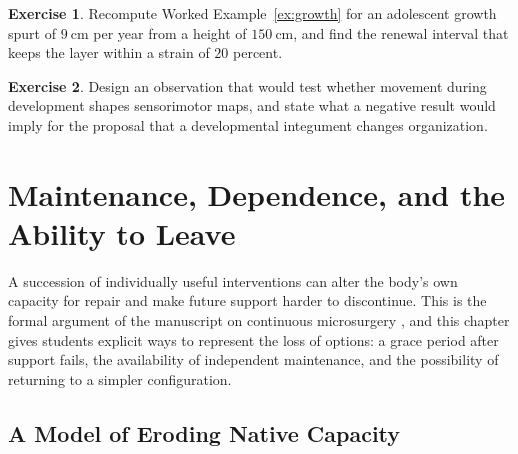 \documentclass[11pt,openany]{book}
\theoremstyle{definition}
\newtheorem{exercise}{Exercise}[chapter]
\theoremstyle{remark}
\begin{document}
\begin{exercise}
Recompute Worked Example~\ref{ex:growth} for an adolescent growth spurt of $9\ \mathrm{cm}$ per year from a height of $150\ \mathrm{cm}$, and find the renewal interval that keeps the layer within a strain of $20$ percent.
\end{exercise}

\begin{exercise}
Design an observation that would test whether movement during development shapes sensorimotor maps, and state what a negative result would imply for the proposal that a developmental integument changes organization.
\end{exercise}

\chapter{Maintenance, Dependence, and the Ability to Leave}
\label{ch:dependence}

A succession of individually useful interventions can alter the body's own capacity for repair and make future support harder to discontinue. This is the formal argument of the manuscript on continuous microsurgery \cite{flyxion2026cm}, and this chapter gives students explicit ways to represent the loss of options: a grace period after support fails, the availability of independent maintenance, and the possibility of returning to a simpler configuration.

\section{A Model of Eroding Native Capacity}
\end{document}
